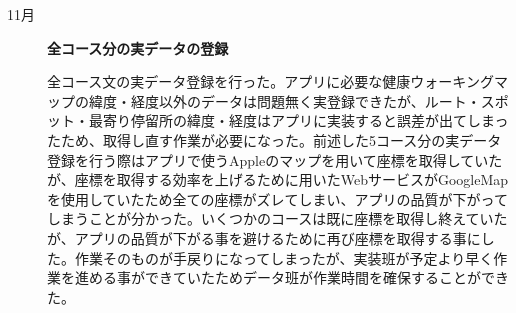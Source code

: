 ﻿\begin{description}
 \item[11月] \textbf{全コース分の実データの登録}\par
 全コース文の実データ登録を行った。アプリに必要な健康ウォーキングマップの緯度・経度以外のデータは問題無く実登録できたが、ルート・スポット・最寄り停留所の緯度・経度はアプリに実装すると誤差が出てしまったため、取得し直す作業が必要になった。前述した5コース分の実データ登録を行う際はアプリで使うAppleのマップを用いて座標を取得していたが、座標を取得する効率を上げるために用いたWebサービスがGoogleMapを使用していたため全ての座標がズレてしまい、アプリの品質が下がってしまうことが分かった。いくつかのコースは既に座標を取得し終えていたが、アプリの品質が下がる事を避けるために再び座標を取得する事にした。作業そのものが手戻りになってしまったが、実装班が予定より早く作業を進める事ができていたためデータ班が作業時間を確保することができた。
  \par

\end{description}
